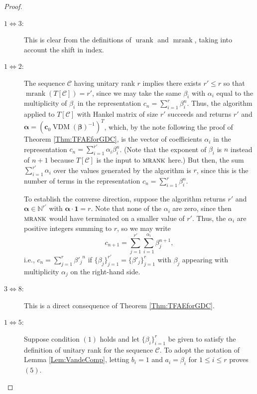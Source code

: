 \documentclass[12pt,reqno]{article}
\newcommand{\malg}{\textsc{mrank}}
\DeclareMathOperator{\urank}{urank}
\DeclareMathOperator{\mrank}{mrank}
\DeclareMathOperator{\vdm}{VDM}
\begin{document}
\begin{proof}

\begin{description}

\item[$1 \Leftrightarrow 3$:] This is clear from the definitions of $\urank$ and $\mrank$, taking into account the shift in index. 

\item[$1\Leftrightarrow 2$:] The sequence $\mathcal{C}$ having unitary rank $r$ implies there exists $r'\leq r$ so that $\mrank(T[\mathcal{C}]) = r'$, since we may take the same $\beta_i$ with $\alpha_i$ equal to the multiplicity of $\beta_i$ in the representation $c_n = \sum_{i=1}^r \beta_i^n$.  Thus, the algorithm applied to $T[\mathcal{C}]$ with Hankel matrix of size $r'$ succeeds and returns $r'$ and $\boldsymbol{\alpha} = (\mathbf{c}_0 \vdm(\boldsymbol{\beta})^{-1})^T$, which, by the note following the proof of Theorem \ref{Thm:TFAEforGDC}, is the vector of coefficients $\alpha_i$ in the representation $c_n = \sum_{i=1}^{r'} \alpha_i \beta_i^{n}$.  (Note that the exponent of $\beta_i$ is $n$ instead of $n+1$ because $T[\mathcal{C}]$ is the input to $\malg$ here.)  But then, the sum $\sum_{i=1}^{r'} \alpha_i$ over the values generated by the algorithm is $r$, since this is the number of terms in the representation $c_n = \sum_{i=1}^r \beta_i^n$. 


To establish the converse direction, suppose the algorithm returns $r'$ and $\boldsymbol{\alpha} \in \mathbb{N}^{r'}$ with $\boldsymbol{\alpha} \cdot \mathbf{1} = r$.  Note that none of the $\alpha_i$ are zero, since then $\malg$ would have terminated on a smaller value of $r'$.  Thus, the $\alpha_i$ are positive integers summing to $r$, so we may write
$$
c_{n+1} = \sum_{j=1}^{r'} \sum_{i=1}^{\alpha_i} \beta_j^{n+1},
$$
i.e., $c_n = \sum_{j=1}^r {\beta'_j}^{n}$ if $\{\beta_j\}_{j=1}^{r'} = \{\beta'_j\}_{j=1}^r$ with $\beta_j$ appearing with multiplicity $\alpha_j$ on the right-hand side.

\item[$3\Leftrightarrow 8$:] This is a direct consequence of Theorem \ref{Thm:TFAEforGDC}.

\item[$1 \Leftrightarrow 5$:] Suppose condition $(1)$ holds and let $\{\beta_i\}_{i=1}^r$ be given to satisfy the definition of unitary rank for the sequence $\mathcal{C}$. To adopt the notation of Lemma \ref{Lem:VandeComp}, letting $b_i = 1$ and $a_i = \beta_i$ for $1\leq i\leq r$ proves $(5)$. 


\end{description}
\end{proof}
\end{document}
